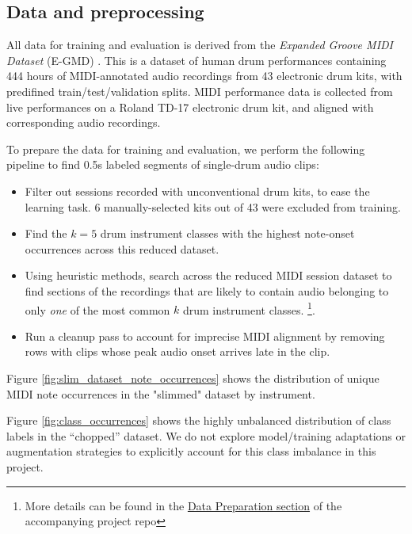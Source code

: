 \documentclass[twocolumn]{article}
\begin{document}
\subsection{Data and preprocessing}

All data for training and evaluation is derived from the \textit{Expanded Groove MIDI Dataset} (E-GMD) \cite{groove2020}.
This is a dataset of human drum performances containing 444 hours of MIDI-annotated audio recordings from 43 electronic drum kits, with predifined train/test/validation splits.
MIDI performance data is collected from live performances on a Roland TD-17 electronic drum kit, and aligned with corresponding audio recordings.

To prepare the data for training and evaluation, we perform the following pipeline to find 0.5s labeled segments of single-drum audio clips:
\begin{itemize}
\item Filter out sessions recorded with unconventional drum kits, to ease the learning task. 6 manually-selected kits out of 43 were excluded from training.
\item Find the $k=5$ drum instrument classes with the highest note-onset occurrences across this reduced dataset.
\item Using heuristic methods, search across the reduced MIDI session dataset to find sections of the recordings that are likely to contain audio belonging to only \textit{one} of the most common $k$ drum instrument classes. \footnote{More details can be found in the \href{https://github.com/khiner/DrumClassification\#prepare-data-for-training}{Data Preparation section} of the accompanying project repo}.
\item Run a cleanup pass to account for imprecise MIDI alignment by removing rows with clips whose peak audio onset arrives late in the clip.
\end{itemize}

Figure \ref{fig:slim_dataset_note_occurrences} shows the distribution of unique MIDI note occurrences in the "slimmed" dataset by instrument.

Figure \ref{fig:class_occurrences} shows the highly unbalanced distribution of class labels in the ``chopped'' dataset.
We do not explore model/training adaptations or augmentation strategies to explicitly account for this class imbalance in this project.
\end{document}
